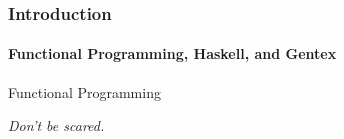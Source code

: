 \begin{frame}
  \frametitle{Introduction}
  \framesubtitle{Functional Programming, Haskell, and Gentex}

  \huge
  Functional Programming

  \normalsize
  \emph{Don't be scared.}
\end{frame}
